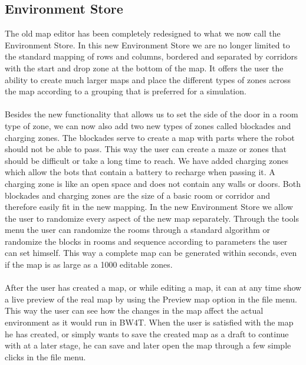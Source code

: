 \documentclass[]{article}
\begin{document}
\subsection*{Environment Store}
The old map editor has been completely redesigned to what we now call the Environment Store. In this new Environment Store we are no longer limited to the standard mapping of rows and columns, bordered and separated by corridors with the start and drop zone at the bottom of the map. It offers the user the ability to create much larger maps and place the different types of zones across the map according to a grouping that is preferred for a simulation.\\
\\
Besides the new functionality that allows us to set the side of the door in a room type of zone, we can now also add two new types of zones called blockades and charging zones. The blockades serve to create a map with parts where the robot should not be able to pass. This way the user can create a maze or zones that should be difficult or take a long time to reach. We have added charging zones which allow the bots that contain a battery to recharge when passing it. A charging zone is like an open space and does not contain any walls or doors. Both blockades and charging zones are the size of a basic room or corridor and therefore easily fit in the new mapping.
In the new Environment Store we allow the user to randomize every aspect of the new map separately. Through the tools menu the user can randomize the rooms through a standard algorithm or randomize the blocks in rooms and sequence according to parameters the user can set himself. This way a complete map can be generated within seconds, even if the map is as large as a 1000 editable zones.\\
\\
After the user has created a map, or while editing a map, it can at any time show a live preview of the real map by using the Preview map option in the file menu. This way the user can see how the changes in the map affect the actual environment as it would run in BW4T. When the user is satisfied with the map he has created, or simply wants to save the created map as a draft to continue with at a later stage, he can save and later open the map through a few simple clicks in the file menu.
\end{document}
